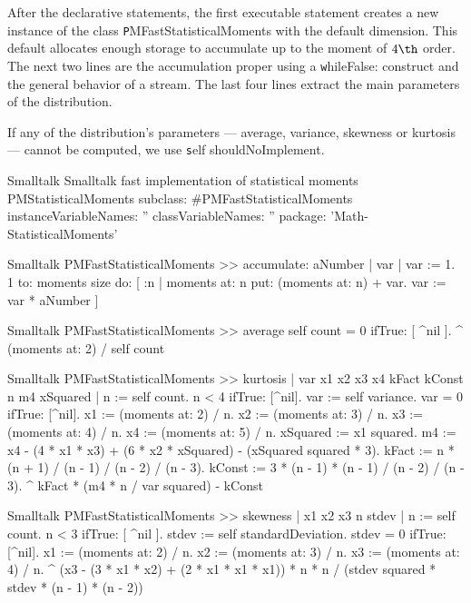 After the declarative statements, the first executable statement
creates a new instance of the class {\texttt PMFastStatisticalMoments} with the
default dimension.
This default allocates enough storage to accumulate up to the
moment of $4\th$ order.
The next two lines are the accumulation proper using a {\texttt whileFalse:}
construct and the general behavior of a stream.
The last four lines extract the main parameters of the distribution.

If any of the distribution's parameters --- average, variance,
skewness or kurtosis --- cannot be computed, we use {\texttt self shouldNoImplement}.

\begin{listing}[label=lst:fastmoments]{Smalltalk}
{Smalltalk fast implementation of statistical moments}
PMStatisticalMoments subclass: #PMFastStatisticalMoments
   instanceVariableNames: ''
   classVariableNames: ''
   package: 'Math-StatisticalMoments'
\end{listing}

\begin{displaycode}{Smalltalk}
PMFastStatisticalMoments >> accumulate: aNumber
    | var |
    var := 1.
    1 to: moments size
        do: 
            [ :n | 
            moments at: n put: (moments at: n) + var.
            var := var * aNumber ]
\end{displaycode}

\begin{displaycode}{Smalltalk}
PMFastStatisticalMoments >> average
    self count = 0 ifTrue: [ ^nil ].
    ^ (moments at: 2) / self count
\end{displaycode}

\begin{displaycode}{Smalltalk}
PMFastStatisticalMoments >> kurtosis
    | var x1 x2 x3 x4 kFact kConst n m4 xSquared |
    n := self count.
    n < 4 ifTrue: [^nil].
    var := self variance.
    var = 0 ifTrue: [^nil].
    x1 := (moments at: 2) / n.
    x2 := (moments at: 3) / n.
    x3 := (moments at: 4) / n.
    x4 := (moments at: 5) / n.
    xSquared := x1 squared.
    m4 := x4 - (4 * x1 * x3) + (6 * x2 * xSquared) - (xSquared 
                                                         squared * 3).
    kFact := n * (n + 1) / (n - 1) / (n - 2) / (n - 3).
    kConst := 3 * (n - 1) * (n - 1) / (n - 2) / (n - 3).
    ^ kFact * (m4 * n / var squared) - kConst
\end{displaycode}

\begin{displaycode}{Smalltalk}
PMFastStatisticalMoments >> skewness
    | x1 x2 x3 n stdev |
    n := self count.
    n < 3 ifTrue: [ ^nil ].
    stdev := self standardDeviation.
    stdev = 0 ifTrue: [^nil].
    x1 := (moments at: 2) / n.
    x2 := (moments at: 3) / n.
    x3 := (moments at: 4) / n.
    ^ (x3 - (3 * x1 * x2) + (2 * x1 * x1 * x1)) * n * n 
        / (stdev squared * stdev * (n - 1) * (n - 2))
\end{displaycode}

